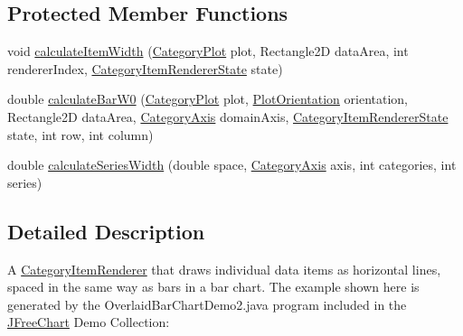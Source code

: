 \subsection*{Protected Member Functions}
\begin{DoxyCompactItemize}
\item 
void \mbox{\hyperlink{classorg_1_1jfree_1_1chart_1_1renderer_1_1category_1_1_level_renderer_aa2277926f1ec1c57fbfb3a124d4ce090}{calculate\+Item\+Width}} (\mbox{\hyperlink{classorg_1_1jfree_1_1chart_1_1plot_1_1_category_plot}{Category\+Plot}} plot, Rectangle2D data\+Area, int renderer\+Index, \mbox{\hyperlink{classorg_1_1jfree_1_1chart_1_1renderer_1_1category_1_1_category_item_renderer_state}{Category\+Item\+Renderer\+State}} state)
\item 
double \mbox{\hyperlink{classorg_1_1jfree_1_1chart_1_1renderer_1_1category_1_1_level_renderer_a3c2b9291aa5e0532e0dc771fe9de8f6f}{calculate\+Bar\+W0}} (\mbox{\hyperlink{classorg_1_1jfree_1_1chart_1_1plot_1_1_category_plot}{Category\+Plot}} plot, \mbox{\hyperlink{classorg_1_1jfree_1_1chart_1_1plot_1_1_plot_orientation}{Plot\+Orientation}} orientation, Rectangle2D data\+Area, \mbox{\hyperlink{classorg_1_1jfree_1_1chart_1_1axis_1_1_category_axis}{Category\+Axis}} domain\+Axis, \mbox{\hyperlink{classorg_1_1jfree_1_1chart_1_1renderer_1_1category_1_1_category_item_renderer_state}{Category\+Item\+Renderer\+State}} state, int row, int column)
\item 
double \mbox{\hyperlink{classorg_1_1jfree_1_1chart_1_1renderer_1_1category_1_1_level_renderer_a4186c088e3f155a2688d7b95694a37d6}{calculate\+Series\+Width}} (double space, \mbox{\hyperlink{classorg_1_1jfree_1_1chart_1_1axis_1_1_category_axis}{Category\+Axis}} axis, int categories, int series)
\end{DoxyCompactItemize}


\subsection{Detailed Description}
A \mbox{\hyperlink{interfaceorg_1_1jfree_1_1chart_1_1renderer_1_1category_1_1_category_item_renderer}{Category\+Item\+Renderer}} that draws individual data items as horizontal lines, spaced in the same way as bars in a bar chart. The example shown here is generated by the {\ttfamily Overlaid\+Bar\+Chart\+Demo2.\+java} program included in the \mbox{\hyperlink{classorg_1_1jfree_1_1chart_1_1_j_free_chart}{J\+Free\+Chart}} Demo Collection\+: ~\newline
~\newline
  

